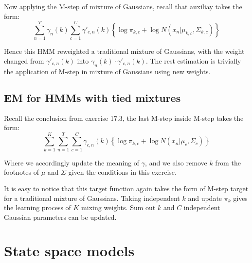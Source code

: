 \documentclass[UTF8]{ctexart}
\begin{document}
Now applying the M-step of mixture of Gaussians, recall that auxiliay takes the form:
$$\sum_{n=1}^{T}\gamma_{n}(k)\sum_{c=1}^{C}\gamma'_{c,n}(k)\left\{\log \pi_{k,c}+\log N(x_{n}|\mu_{k,c},\Sigma_{k,c}) \right\}$$

Hence this HMM reweighted a traditional mixture of Gaussians, with the weight changed from $\gamma'_{c,n}(k)$ into $\gamma_{n}(k)\cdot \gamma'_{c,n}(k)$. The rest estimation is trivially the application of M-step in mixture of Gaussians using new weights.

\subsection{EM for HMMs with tied mixtures}
Recall the conclusion from exercise 17.3, the last M-step inside M-step takes the form:
$$\sum_{k=1}^{K}\sum_{n=1}^{T}\sum_{c=1}^{C}\gamma_{c,n}(k)\left\{ \log \pi_{k,c} + \log N(x_{n}|\mu_{c},\Sigma_{c}) \right\}$$

Where we accordingly update the meaning of $\gamma$, and we also remove $k$ from the footnotes of $\mu$ and $\Sigma$ given the conditions in this exercise.

It is easy to notice that this target function again takes the form of M-step target for a traditional mixture of Gaussians. Taking independent $k$ and update $\pi_{k}$ gives the learning process of $K$ mixing weights. Sum out $k$ and $C$ independent Gaussian parameters can be updated.

\newpage
\section{State space models}
\end{document}

